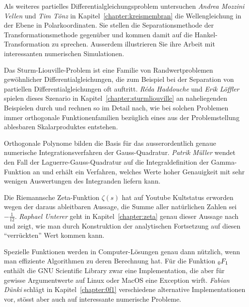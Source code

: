 Als weiteres partielles Differentialgleichungsproblem
untersuchen 
{\em Andrea Mozzini Vellen}
%
%
und
{\em Tim Tönz}
%
%
in Kapitel~\ref{chapter:kreismembran}
die Wellengleichung in der Ebene in Polarkoordinaten.
Sie stellen die Separationsmethode der Transformationsmethode
gegenüber und kommen damit auf die Hankel-Transformation zu sprechen.
Ausserdem illustrieren Sie ihre Arbeit mit interessanten numerischen
Simulationen.

Das Sturm-Liouville-Problem ist eine Familie von Randwertproblemen
gewöhnlicher Differentialgleichungen, die zum Beispiel bei der
Separation von partiellen Differentialgleichungen oft auftritt.
{\em Réda Haddouche}
%
%
und
{\em Erik Löffler}
%
%
spielen dieses Szenario in Kapitel~\ref{chapter:sturmliouville} an
naheliegenden Beispielen durch und rechnen so im Detail nach, wie bei
solchen Problemen immer orthogonale Funktionenfamilien bezüglich eines
aus der Problemstellung ablesbaren Skalarproduktes entstehen.

Orthogonale Polynome bilden die Basis für das ausserordentlich
genaue numerische Integrationsverfahren der Gauss-Quadratur.
{\em Patrik Müller}
%
%
wendet den Fall der Laguerre-Gauss-Quadratur auf die Integraldefinition
der Gamma-Funktion an und erhält ein Verfahren, welches Werte hoher
Genauigkeit mit sehr wenigen Auswertungen des Integranden liefern kann.

Die Riemannsche Zeta-Funktion $\zeta(s)$ hat auf Youtube Kultstatus
erworden wegen der daraus ableitbaren Aussage, die Summe aller natürlichen
Zahlen sei $-\frac1{12}$.
{\em Raphael Unterer}
%
%
geht in Kapitel~\ref{chapter:zeta} genau dieser Aussage nach und zeigt,
wie man durch Konstruktion der analytischen Fortsetzung auf diesen
``verrückten'' Wert kommen kann.

Spezielle Funktionen werden in Computer-Lösungen genau dann nützlich,
wenn man effiziente Algorithmen zu deren Berechnung hat.
Für die Funktion $\mathstrut_0F_1$ enthält die GNU Scientific Library
%
%
zwar eine Implementation, die aber für gewisse Argumentwerte 
auf Linux oder MacOS eine Exception wirft.
{\em Fabian Dünki} 
%
%
schlägt in Kapitel~\ref{chapter:0f1} verschiedene alternative
Implementationen vor, stösst aber auch auf interessante numerische Probleme.

